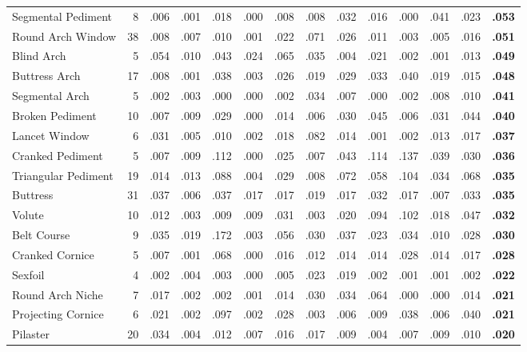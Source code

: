 \documentclass[lineno,pdflatex,sn-mathphys-num]{sn-jnl}%
\theoremstyle{thmstyleone}%
\theoremstyle{thmstyletwo}%
\theoremstyle{thmstylethree}%
\begin{document}
\begin{appendices}
\begin{table}[!htbp]
\begin{tabular}{@{}lrcccccccccccc@{}}
Segmental Pediment & 8 & .006 & .001 & .018 & .000 & .008 & .008 & .032 & .016 & .000 & .041 & .023 & \textbf{.053} \\
Round Arch Window & 38 & .008 & .007 & .010 & .001 & .022 & .071 & .026 & .011 & .003 & .005 & .016 & \textbf{.051} \\
Blind Arch & 5 & .054 & .010 & .043 & .024 & .065 & .035 & .004 & .021 & .002 & .001 & .013 & \textbf{.049} \\
Buttress Arch & 17 & .008 & .001 & .038 & .003 & .026 & .019 & .029 & .033 & .040 & .019 & .015 & \textbf{.048} \\
Segmental Arch & 5 & .002 & .003 & .000 & .000 & .002 & .034 & .007 & .000 & .002 & .008 & .010 & \textbf{.041} \\
Broken Pediment & 10 & .007 & .009 & .029 & .000 & .014 & .006 & .030 & .045 & .006 & .031 & .044 & \textbf{.040} \\
Lancet Window & 6 & .031 & .005 & .010 & .002 & .018 & .082 & .014 & .001 & .002 & .013 & .017 & \textbf{.037} \\
Cranked Pediment & 5 & .007 & .009 & .112 & .000 & .025 & .007 & .043 & .114 & .137 & .039 & .030 & \textbf{.036} \\
Triangular Pediment & 19 & .014 & .013 & .088 & .004 & .029 & .008 & .072 & .058 & .104 & .034 & .068 & \textbf{.035} \\
Buttress & 31 & .037 & .006 & .037 & .017 & .017 & .019 & .017 & .032 & .017 & .007 & .033 & \textbf{.035} \\
Volute & 10 & .012 & .003 & .009 & .009 & .031 & .003 & .020 & .094 & .102 & .018 & .047 & \textbf{.032} \\
Belt Course & 9 & .035 & .019 & .172 & .003 & .056 & .030 & .037 & .023 & .034 & .010 & .028 & \textbf{.030} \\
Cranked Cornice & 5 & .007 & .001 & .068 & .000 & .016 & .012 & .014 & .014 & .028 & .014 & .017 & \textbf{.028} \\
Sexfoil & 4 & .002 & .004 & .003 & .000 & .005 & .023 & .019 & .002 & .001 & .001 & .002 & \textbf{.022} \\
Round Arch Niche & 7 & .017 & .002 & .002 & .001 & .014 & .030 & .034 & .064 & .000 & .000 & .014 & \textbf{.021} \\
Projecting Cornice & 6 & .021 & .002 & .097 & .002 & .028 & .003 & .006 & .009 & .038 & .006 & .040 & \textbf{.021} \\
Pilaster & 20 & .034 & .004 & .012 & .007 & .016 & .017 & .009 & .004 & .007 & .009 & .010 & \textbf{.020} \\

\end{tabular}
\end{table}
\end{appendices}
\end{document}
